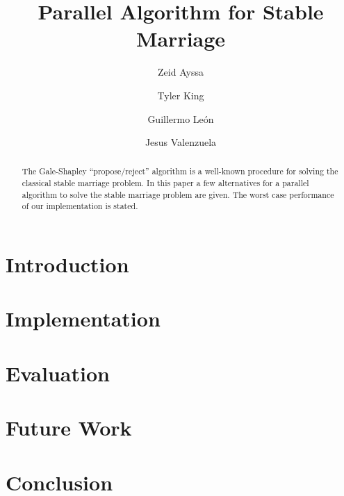 \documentclass[sigconf]{acmart}
\begin{document}
\title{Parallel Algorithm for Stable Marriage}

\author{Zeid Ayssa}

\author{Tyler King}

\author{Guillermo Le\'on}

\author{Jesus Valenzuela}

\begin{abstract}
The Gale-Shapley\cite{gale1962college} “propose/reject” algorithm is a well-known procedure for solving the classical stable marriage problem. In this paper a few alternatives for a parallel algorithm to solve the stable marriage problem are given. The worst case performance of our implementation is stated.    
\end{abstract}

\maketitle


\section{Introduction}


\section{Implementation}


\section{Evaluation}


\section{Future Work}


\section{Conclusion}




\end{document}
